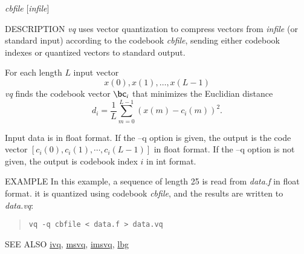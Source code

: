 \begin{synopsis}
\item [vq] [ --l $L$ ] [ --n $N$ ] [ --q ] {\em cbfile} [{\em infile}]
\end{synopsis}

\begin{qsection}{DESCRIPTION}
{\em vq} uses vector quantization to compress vectors 
from {\em infile} (or standard input)
according to the codebook {\em cbfile}, 
sending either codebook indexes or quantized vectors to standard output.

For each length $L$ input vector
\begin{displaymath}
  x(0),x(1),\dots,x(L-1)
\end{displaymath}
{\em vq} finds the codebook vector $\bc_i$ 
that minimizes the Euclidian distance
\begin{displaymath}
d_i = \frac{1}{L}\sum_{m=0}^{L-1} (x(m)-c_i(m))^2. 
\end{displaymath}

Input data is in float format.
If the --q option is given, 
the output is the code vector $[c_i(0), c_i(1), \cdots, c_i(L-1)]$ 
in float format.
If the --q option is not given, 
the output is codebook index $i$ in int format.
\end{qsection}

\begin{options}
\end{options}

\begin{qsection}{EXAMPLE}
In this example, a sequence of length 25 is read from {\em data.f}
in float format.
it is quantized using codebook {\em cbfile},
and the results are written to {\em data.vq}:
\begin{quote}
 \verb!vq -q cbfile < data.f > data.vq!
\end{quote} 
\end{qsection}

\begin{qsection}{SEE ALSO}
\hyperlink{ivq}{ivq},
\hyperlink{msvq}{msvq},
\hyperlink{imsvq}{imsvq},
\hyperlink{lbg}{lbg}
\end{qsection}
